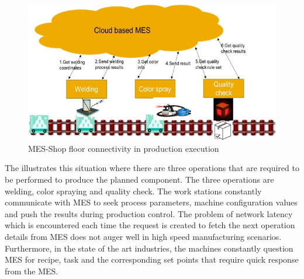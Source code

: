 \documentclass[10pt,conference,compsocconf]{IEEEtran}
\begin{document}
\begin{figure} [h]
\centering
\includegraphics [scale=0.5]{"Figures/MES-SF_Connectivity"}
\caption{MES-Shop floor connectivity in production execution}
\label{fig:MES-SF_Connectivity}
\end{figure}

The  illustrates this situation where there are three operations that are required to be performed to produce the planned component. The three operations are welding, color spraying and quality check. The work stations constantly communicate with MES to seek process parameters, machine configuration values and push the results during production control. The problem of network latency which is encountered each time the request is created to fetch the next operation details from MES does not auger well in high speed manufacturing scenarios. Furthermore, in the state of the art industries, the machines constantly question MES for recipe, task and the corresponding set points that require quick response from the MES.
\end{document}
